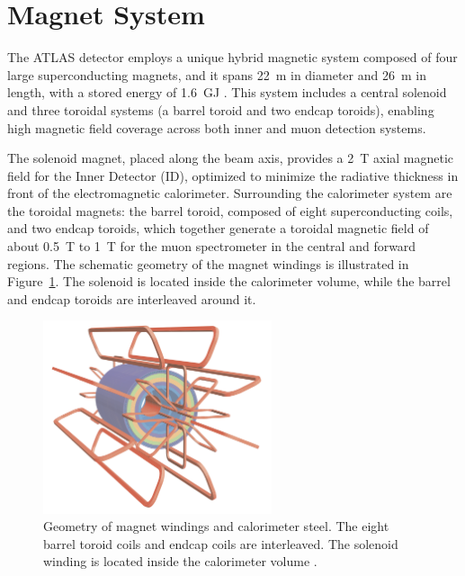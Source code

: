 \section{Magnet System} \label{sec:MagnetSystem}
The ATLAS detector employs a unique hybrid magnetic system composed of four large superconducting magnets, and it spans 22~m in diameter and 26~m in length, with a stored energy of 1.6~GJ \cite{ATLASDetector2008}. This system includes a central solenoid and three toroidal systems (a barrel toroid and two endcap toroids), enabling high magnetic field coverage across both inner and muon detection systems.

The solenoid magnet, placed along the beam axis, provides a 2~T axial magnetic field for the Inner Detector (ID), optimized to minimize the radiative thickness in front of the electromagnetic calorimeter. Surrounding the calorimeter system are the toroidal magnets: the barrel toroid, composed of eight superconducting coils, and two endcap toroids, which together generate a toroidal magnetic field of about 0.5~T to 1~T for the muon spectrometer in the central and forward regions. The schematic geometry of the magnet windings is illustrated in Figure~\ref{fig:magnet_windings}. The solenoid is located inside the calorimeter volume, while the barrel and endcap toroids are interleaved around it. 

\begin{figure}[htbp]
  \centering
  \includegraphics[width=0.6\textwidth]{figs/chapter2/magnet_windings.png}
  \caption{Geometry of magnet windings and calorimeter steel. The eight barrel toroid coils and endcap coils are interleaved. The solenoid winding is located inside the calorimeter volume \cite{ATLASDetector2008}.}
  \label{fig:magnet_windings}
\end{figure}


